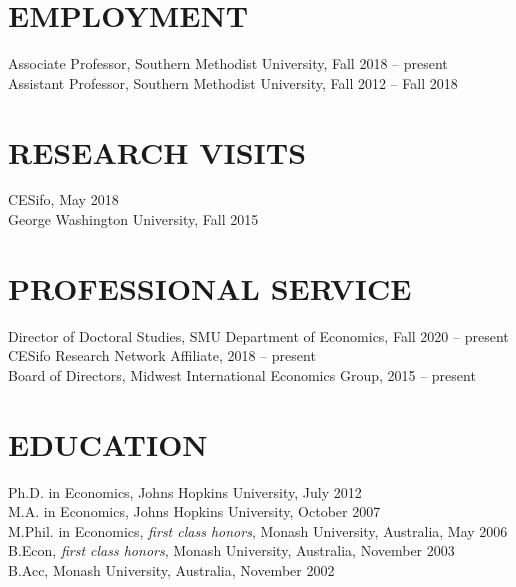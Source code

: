 \documentclass[11pt]{res}
\begin{document}
\begin{resume}
\hspace{-0.5in}\makebox[6.1in]{\hrulefill}

\section{EMPLOYMENT} \vspace{1.5mm}
Associate Professor, Southern Methodist University, Fall 2018 -- present\\
Assistant Professor, Southern Methodist University, Fall 2012 -- Fall 2018

\section{RESEARCH VISITS} \vspace{1.5mm}
CESifo, May 2018\vspace{1.5mm}\\
George Washington University, Fall 2015

\section{PROFESSIONAL SERVICE} \vspace{1.5mm}
Director of Doctoral Studies, SMU Department of Economics, Fall 2020 -- present\\
CESifo Research Network Affiliate, 2018 --  present\\
Board of Directors, Midwest International Economics Group, 2015 -- present

\section{EDUCATION} \vspace{1.5mm}
Ph.D. in Economics, Johns Hopkins University, July 2012 \vspace{1.5mm}\\
M.A. in Economics, Johns Hopkins University, October 2007\vspace{1.5mm}\\
M.Phil. in Economics, \emph{first class honors}, Monash University, Australia, May 2006\vspace{1.5mm}\\
B.Econ, \emph{first class honors}, Monash University, Australia, November 2003\vspace{1.5mm}\\
B.Acc, Monash University, Australia, November 2002


\end{resume}
\end{document}
